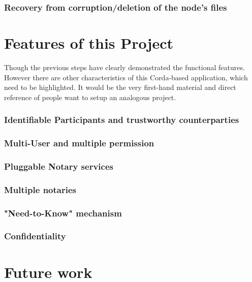 \subsubsection{Recovery from corruption/deletion of the node's files}


\section{Features of this Project}
Though the previous steps have clearly demonstrated the functional features. However there are other characteristics of this Corda-based application, which need to be highlighted. It would be the very first-hand material and direct reference of people want to setup an analogous project. 

\subsubsection{Identifiable Participants and trustworthy counterparties}

\subsubsection{Multi-User and multiple permission}

\subsubsection{Pluggable Notary services}
 
\subsubsection{Multiple notaries}
 
\subsubsection{"Need-to-Know" mechanism}

\subsubsection{Confidentiality}

\section{Future work}

